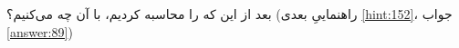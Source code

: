 \section{}
\paragraph{}\label{hint:36}
بعد از این که  را محاسبه کردیم، با آن چه می‌کنیم؟ (راهنماییِ بعدی \ref{hint:152}، جواب \ref{answer:89})